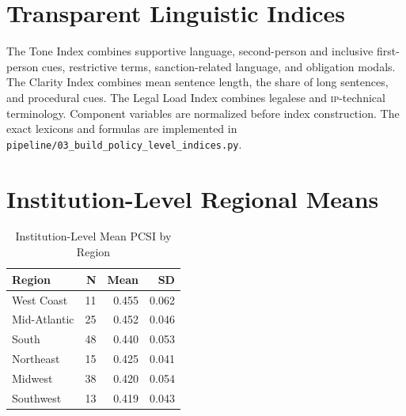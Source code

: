 \documentclass[12pt]{article}
\newcommand{\IP}{\textsc{ip}}
\begin{document}
\section{Transparent Linguistic Indices}

The Tone Index combines supportive language, second-person and inclusive first-person cues, restrictive terms, sanction-related language, and obligation modals. The Clarity Index combines mean sentence length, the share of long sentences, and procedural cues. The Legal Load Index combines legalese and \IP{}-technical terminology. Component variables are normalized before index construction. The exact lexicons and formulas are implemented in \texttt{pipeline/03\_build\_policy\_level\_indices.py}.

\section{Institution-Level Regional Means}

\begin{table}[H]
\centering
\caption{Institution-Level Mean PCSI by Region}
\small
\begin{tabular}{lrrr}
\toprule
Region & N & Mean & SD\\
\midrule
West Coast & 11 & 0.455 & 0.062\\
Mid-Atlantic & 25 & 0.452 & 0.046\\
South & 48 & 0.440 & 0.053\\
Northeast & 15 & 0.425 & 0.041\\
Midwest & 38 & 0.420 & 0.054\\
Southwest & 13 & 0.419 & 0.043\\
\bottomrule
\end{tabular}
\end{table}
\end{document}

